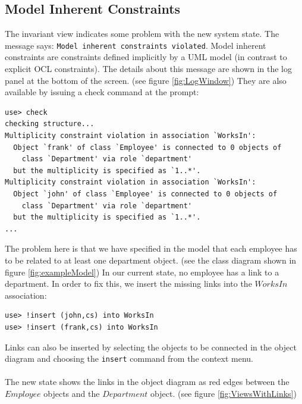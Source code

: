 \documentclass[a4paper,titlepage,oneside,final]{scrreprt} %
\begin{document}
\subsection{Model Inherent Constraints}\label{modelinherent}
The invariant view indicates some problem with the new system state.
The message says: \verb+Model inherent constraints violated+. Model inherent
constraints are constraints defined implicitly by a UML model (in contrast
to explicit OCL constraints). The details about this message are shown in the log
panel at the bottom of the screen. (see figure \ref{fig:LogWindow})
They are also available by issuing a check command at the prompt:
\begin{verbatim}
use> check
checking structure...
Multiplicity constraint violation in association `WorksIn':
  Object `frank' of class `Employee' is connected to 0 objects of
    class `Department' via role `department'
  but the multiplicity is specified as `1..*'.
Multiplicity constraint violation in association `WorksIn':
  Object `john' of class `Employee' is connected to 0 objects of
    class `Department' via role `department'
  but the multiplicity is specified as `1..*'.
...
\end{verbatim}
The problem here is that we have specified in the model
that each employee has to be related to at least one department
object. (see the class diagram shown in figure \ref{fig:exampleModel})
In our current state, no employee
has a link to a department. In order to fix this, we insert the missing
links into the $\mathit{WorksIn}$ association:
\begin{verbatim}
use> !insert (john,cs) into WorksIn
use> !insert (frank,cs) into WorksIn
\end{verbatim}
Links can also be inserted by selecting the objects to
be connected in the object diagram and choosing the \verb+insert+ command from the context menu.\\\\
The new state shows the links in the object diagram as red
edges between the $\mathit{Employee}$ objects and the $\mathit{Department}$ object.
(see figure \ref{fig:ViewsWithLinks})
\end{document}
